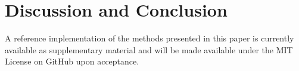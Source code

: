 \documentclass{article}
\begin{document}



\section{Discussion and Conclusion}
\label{sec:conclusion}







A reference implementation of the methods presented in this paper is currently available as supplementary material and will be made available under the MIT License on GitHub upon acceptance.






%
\begingroup
\small


\endgroup
\end{document}

